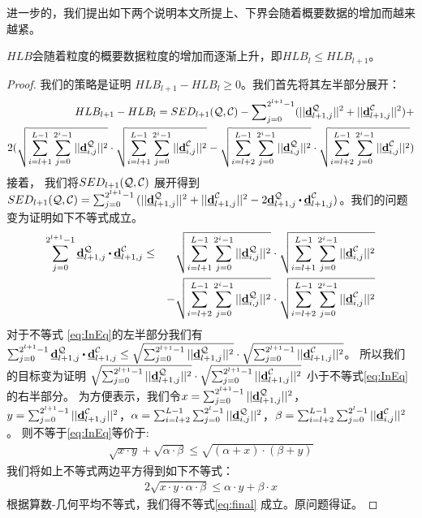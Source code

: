 \allowdisplaybreaks[4]
进一步的，我们提出如下两个说明本文所提上、下界会随着概要数据的增加而越来越紧。
\begin{theorem}[]\label{theory:lower}
	$HLB$会随着粒度的概要数据粒度的增加而逐渐上升，即$HLB_{l} \le HLB_{l+1}$。
\end{theorem}
\begin{proof}\label{proof:p2}
	我们的策略是证明 $HLB_{l+1}- HLB_{l}\ge 0$。我们首先将其左半部分展开：
	\begin{eqnarray}\label{eq:minus}
	HLB_{l+1}- HLB_{l}= SED_{l+1}({\cal Q},{\cal C}) - \sum\nolimits_{j=0}^{2^{l+1}-1}(||\emph{{\textbf{d}}}_{l+1,j}^{\cal Q}||^2  + ||\emph{{\textbf{d}}}_{l+1,j}^{\cal C}||^2)+\nonumber\\
	2(\sqrt{\sum_{i=l+1}^{L -1}\sum_{j=0}^{2^i-1}||\emph{{\textbf{d}}}_{i,j}^{\cal Q}||^2} \cdot \sqrt{\sum_{i=l+1}^{L -1}\sum_{j=0}^{2^i-1}||\emph{{\textbf{d}}}_{i,j}^{\cal C}||^2} -\sqrt{\sum_{i=l+2}^{L -1}\sum_{j=0}^{2^i-1}||\emph{{\textbf{d}}}_{i,j}^{\cal Q}||^2} \cdot \sqrt{\sum_{i=l+2}^{L -1}\sum_{j=0}^{2^i-1}||\emph{{\textbf{d}}}_{i,j}^{\cal C}||^2})\nonumber
	\end{eqnarray}	
	接着， 我们将$SED_{l+1}({\cal Q},{\cal C})$ 展开得到$SED_{l+1}({\cal Q},{\cal C})=\sum_{j=0}^{2^{l+1}-1}{(||\vd_{l+1,j}^{\cal Q}||^2+||\vd_{l+1,j}^{\cal C}||^2}-2 \vd_{l+1,j}^{\cal Q} \bigcdot \vd_{l+1,j}^{\cal C})$。我们的问题变为证明如下不等式成立。
	\begin{eqnarray}\label{eq:InEq}
	\sum_{j=0}^{2^{l+1}-1}\vd_{l+1,j}^{\cal Q} \bigcdot \vd_{l+1,j}^{\cal C} &\le& \sqrt{\sum_{i=l+1}^{L-1}\sum_{j=0}^{2^i-1}||\vd_{i,j}^{\cal Q}||^2} \cdot \sqrt{\sum_{i=l+1}^{L-1}\sum_{j=0}^{2^i-1}||\vd_{i,j}^{\cal C}||^2} \nonumber\\
	&\quad&	-	\sqrt{\sum_{i=l+2}^{L-1}\sum_{j=0}^{2^i-1}||\vd_{i,j}^{\cal Q}||^2} \cdot \sqrt{\sum_{i=l+2}^{L-1}\sum_{j=0}^{2^i-1}||\vd_{i,j}^{\cal C}||^2} 
	\end{eqnarray}	
	对于不等式 \ref{eq:InEq}的左半部分我们有
	$\sum_{j=0}^{2^{l+1}-1}\vd_{l+1,j}^{\cal Q}\bigcdot \vd_{l+1,j}^{\cal C} \le
	\sqrt{\sum_{j=0}^{2^{l+1}-1}||\vd_{l+1,j}^{\cal Q}||^2} \cdot \sqrt{\sum_{j=0}^{2^{l+1}-1}||\vd_{l+1,j}^{\cal C}||^2}$。
	所以我们的目标变为证明
	$\sqrt{\sum_{j=0}^{2^{l+1}-1}||\emph{{\textbf{d}}}_{l+1,j}^{\cal Q}||^2} \cdot \sqrt{\sum_{j=0}^{2^{l+1}-1}||\emph{{\textbf{d}}}_{l+1,j}^{\cal C}||^2}$
	小于不等式\ref{eq:InEq}的右半部分。
	为方便表示，我们令$x= \sum_{j=0}^{2^{l+1}-1}||\emph{{\textbf{d}}}_{l+1,j}^{\cal Q}||^2$，$y=\sum_{j=0}^{2^{l+1}-1}||\emph{{\textbf{d}}}_{l+1,j}^{\cal C}||^2$，$\alpha = \sum_{i=l+2}^{L-1}\sum_{j=0}^{2^l-1}||\emph{{\textbf{d}}}_{i,j}^{\cal Q}||^2$，$\beta =  \sum_{i=l+2}^{L-1}\sum_{j=0}^{2^l-1}||\emph{{\textbf{d}}}_{i,j}^{\cal C}||^2$。
	则不等于\ref{eq:InEq}等价于:
	\begin{eqnarray}\label{eq:sim}
	\sqrt{x \cdot y} + \sqrt{\alpha \cdot \beta} \le \sqrt{(\alpha+x) \cdot (\beta+y)}
	\end{eqnarray}	
	我们将如上不等式两边平方得到如下不等式：
	\begin{eqnarray}\label{eq:final}
	2\sqrt{x\cdot y \cdot \alpha \cdot \beta} \le \alpha \cdot y+\beta\cdot x
	\end{eqnarray}	
	根据算数-几何平均不等式，我们得不等式\ref{eq:final} 成立。原问题得证。
\end{proof}


